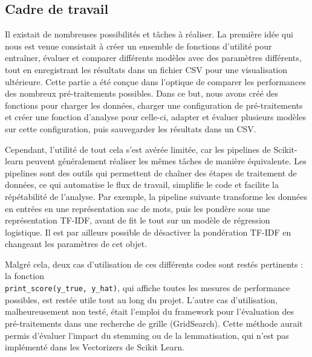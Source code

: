 \documentclass{article}
\begin{document}
\subsection{Cadre de travail}
Il existait de nombreuses possibilités et tâches à réaliser. La première idée qui nous est venue consistait à créer un ensemble de fonctions d'utilité pour entraîner, évaluer et comparer différents modèles avec des paramètres différents, tout en enregistrant les résultats dans un fichier CSV pour une visualisation ultérieure. Cette partie a été conçue dans l'optique de comparer les performances des nombreux pré-traitements possibles.
Dans ce but, nous avons créé des fonctions pour charger les données, charger une configuration de pré-traitements et créer une fonction d'analyse pour celle-ci, adapter et évaluer plusieurs modèles sur cette configuration, puis sauvegarder les résultats dans un CSV.

Cependant, l'utilité de tout cela s'est avérée limitée, car les pipelines de Scikit-learn peuvent généralement réaliser les mêmes tâches de manière équivalente. Les pipelines sont des outils qui permettent de chaîner des étapes de traitement de données, ce qui automatise le flux de travail, simplifie le code et facilite la répétabilité de l'analyse. Par exemple, la pipeline suivante transforme les données en entrées en une représentation sac de mots, puis les pondère sous une représentation TF-IDF, avant de fit le tout sur un modèle de régression logistique. Il est par ailleurs possible de désactiver la pondération TF-IDF en changeant les paramètres de cet objet.

\begin{center}
\end{center}

Malgré cela, deux cas d'utilisation de ces différents codes sont restés pertinents : la fonction \\ \color{blue} \texttt{print\_score(y\_true, y\_hat)}\color{black}, qui affiche toutes les mesures de performance possibles, est restée utile tout au long du projet. L'autre cas d'utilisation, malheureusement non testé, était l'emploi du framework pour l'évaluation des pré-traitements dans une recherche de grille (GridSearch). Cette méthode aurait permis d'évaluer l'impact du stemming ou de la lemmatisation, qui n'est pas implémenté dans les \color{blue} Vectorizers \color{black} de Scikit Learn.
\end{document}
